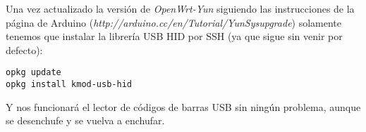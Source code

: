 Una vez actualizado la versión de \emph{OpenWrt-Yun} siguiendo las instrucciones de la página de Arduino (\emph{http://arduino.cc/en/Tutorial/YunSysupgrade}) solamente tenemos que instalar la librería USB HID por SSH (ya que sigue sin venir por defecto):

    \begin{lstlisting}
opkg update
opkg install kmod-usb-hid
    \end{lstlisting}

Y nos funcionará el lector de códigos de barras USB sin ningún problema, aunque se desenchufe y se vuelva a enchufar.